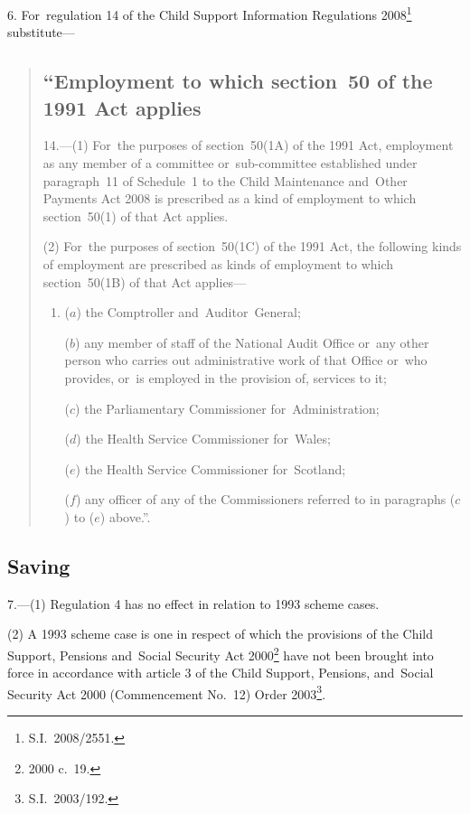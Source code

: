 \documentclass[12pt,a4paper]{article}
\begin{document}
6.  For~regulation 14 of the Child Support Information Regulations 2008\footnote{S.I.~2008/2551.} substitute—
\begin{quotation}
\subsection*{“Employment to which section~50 of the 1991 Act applies}

14.---(1)  For~the purposes of section~50(1A) of the 1991 Act, employment as any member of a committee or~sub-committee established under paragraph~11 of Schedule~1 to the Child Maintenance and~Other Payments Act 2008 is prescribed as a kind of employment to which section~50(1) of that Act applies.

(2) For~the purposes of section~50(1C) of the 1991 Act, the following kinds of employment are prescribed as kinds of employment to which section~50(1B) of that Act applies—
\begin{enumerate}\item[]
($a$) the Comptroller and~Auditor~General;

($b$) any member of staff of the National Audit Office or~any other person who carries out administrative work of that Office or~who provides, or~is employed in the provision of, services to it;

($c$) the Parliamentary Commissioner for~Administration;

($d$) the Health Service Commissioner for~Wales;

($e$) the Health Service Commissioner for~Scotland;

($f$) any officer of any of the Commissioners referred to in paragraphs ($c$)  to ($e$)    above.”.
\end{enumerate}
\end{quotation}

\subsection[7. Saving]{Saving}

7.---(1)  Regulation 4 has no effect in relation to 1993 scheme cases.

(2) A 1993 scheme case is one in respect of which the provisions of the Child Support, Pensions and~Social Security Act 2000\footnote{2000 c.~19.} have not been brought into force in accordance with article 3 of the Child Support, Pensions, and~Social Security Act 2000 (Commencement No.~12) Order 2003\footnote{S.I.~2003/192.}. 
\end{document}
